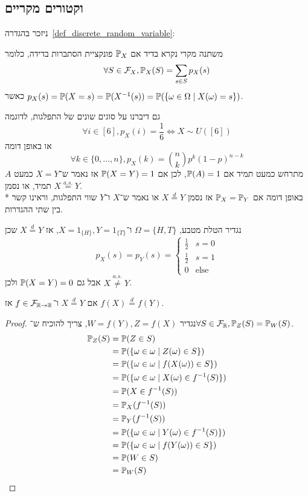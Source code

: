 \subsection{וקטורים מקריים}
ניזכר בהגדרה\ \ref{def_discrete_random_variable}:
\begin{definition*}
	משתנה מקרי נקרא בדיד אם $\mathbb{P}_X$ פונקציית הסתברות בדידה, כלומר
	\[
		\forall S \in \mathcal{F}_X, \mathbb{P}_X(S) = \sum_{s \in S} p_X(s)
	\]
	כאשר $p_X(s) = \mathbb{P}(X = s) = \mathbb{P}(X^{-1}(s)) = \mathbb{P}(\{\omega \in \Omega \mid X(\omega) = s \})$.
\end{definition*}
גם דיברנו על סוגים שונים של התפלגות, לדוגמה
\[
	\forall i \in [6], p_X(i) = \frac{1}{6} \iff X \sim U([6])
\]
או באופן דומה
\[
	\forall k \in \{0, \dots, n\}, p_X(k) = \binom{n}{k} p^k {(1 - p)}^{n - k}
\]
$A$ מתרחש כמעט תמיד אם $\mathbb{P}(A) = 1$, לכן אם $\mathbb{P}(X = Y) = 1$ אז נאמר ש־$X = Y$ כמעט תמיד, או נסמן $X \overset{a.s.}{=} Y$. \\*
באופן דומה אם $\mathbb{P}_X = \mathbb{P}_Y$ אז נסמן $X \overset{d}{=} Y$ או נאמר ש־$X$ ו־$Y$ שווי התפלגות, וראינו קשר בין שתי ההגדרות.
\begin{example}
	נגדיר הטלת מטבע, $\Omega = \{H, T\}$ ו־$X = 1_{\{H\}}, Y = 1_{\{T\}}$, אז $X \overset{d}{=} Y$ שכן
	\[
		p_X(s) = p_Y(s) = \begin{cases}
			\frac{1}{2} & s = 0 \\
			\frac{1}{2} & s = 1 \\
			0 & \text{else}
		\end{cases}
	\]
	אבל גם $\mathbb{P}(X = Y) = 0$ ולכן $X \overset{a.s.}{\ne} Y$.
\end{example}
\begin{proposition}
	אם $X \overset{d}{=} Y$ ו־$f \in \mathcal{F}_{\mathbb{R} \to \mathbb{R}}$ אז $f(X) \overset{d}{=} f(Y)$.
\end{proposition}
\begin{proof}
	נגדיר $W = f(Y), Z = f(X)$,
	צריך להוכיח ש־$\forall S \in \mathcal{F}_{\mathbb{R}}, \mathbb{P}_Z(S) = \mathbb{P}_W(S)$.
	\begin{align*}
		\mathbb{P}_Z(S)
		& = \mathbb{P}(Z \in S) \\
		& = \mathbb{P}(\{\omega \in \omega \mid Z(\omega) \in S\}) \\
		& = \mathbb{P}(\{\omega \in \omega \mid f(X(\omega)) \in S\}) \\
		& = \mathbb{P}(\{\omega \in \omega \mid X(\omega) \in f^{-1}(S)\}) \\
		& = \mathbb{P}(X \in f^{-1}(S)) \\
		& = \mathbb{P}_X(f^{-1}(S)) \\
		& = \mathbb{P}_Y(f^{-1}(S)) \\
		& = \mathbb{P}(\{\omega \in \omega \mid Y(\omega) \in f^{-1}(S)\}) \\
		& = \mathbb{P}(\{\omega \in \omega \mid f(Y(\omega)) \in S\}) \\
		& = \mathbb{P}(W \in S) \\
		& = \mathbb{P}_W(S)
	\end{align*}
\end{proof}
